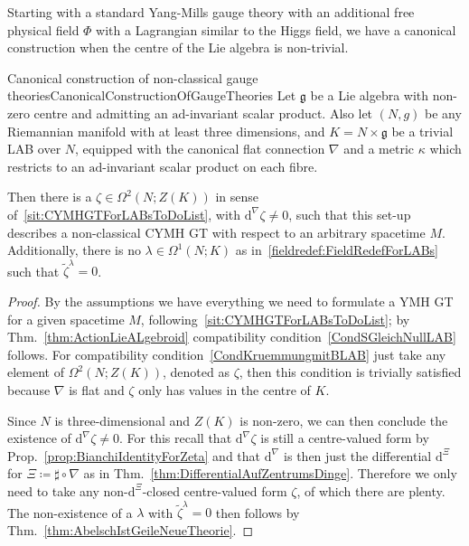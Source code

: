 Starting with a standard Yang-Mills gauge theory with an additional free physical field $\Phi$ with a Lagrangian similar to the Higgs field, we have a canonical construction when the centre of the Lie algebra is non-trivial.

\begin{corollaries}{Canonical construction of non-classical gauge theories}{CanonicalConstructionOfGaugeTheories}
Let $\mathfrak{g}$ be a Lie algebra with non-zero centre and admitting an $\mathrm{ad}$-invariant scalar product. Also let $(N, g)$ be any Riemannian manifold with at least three dimensions, and $K = N \times \mathfrak{g}$ be a trivial LAB over $N$, equipped with the canonical flat connection $\nabla$ and a metric $\kappa$ which restricts to an $\mathrm{ad}$-invariant scalar product on each fibre.

Then there is a $\zeta \in \Omega^2(N; Z(K))$ in sense of~\ref{sit:CYMHGTForLABsToDoList}, with $\mathrm{d}^\nabla \zeta \neq 0$, such that this set-up describes a non-classical CYMH GT with respect to an arbitrary spacetime $M$. Additionally, there is no $\lambda\in\Omega^1(N;K)$ as in~\ref{fieldredef:FieldRedefForLABs} such that $\widetilde{\zeta}^\lambda = 0$.
\end{corollaries}

\begin{proof}
\leavevmode\newline
By the assumptions we have everything we need to formulate a YMH GT for a given spacetime $M$, following~\ref{sit:CYMHGTForLABsToDoList}; by Thm.~\ref{thm:ActionLieALgebroid} compatibility condition~\eqref{CondSGleichNullLAB} follows. For compatibility condition~\eqref{CondKruemmungmitBLAB} just take any element of $\Omega^2(N; Z(K))$, denoted as $\zeta$, then this condition is trivially satisfied because $\nabla$ is flat and $\zeta$ only has values in the centre of $K$.

Since $N$ is three-dimensional and $Z(K)$ is non-zero, we can then conclude the existence of $\mathrm{d}^\nabla \zeta \neq 0$. For this recall that $\mathrm{d}^\nabla \zeta$ is still a centre-valued form by Prop.~\ref{prop:BianchiIdentityForZeta} and that $\mathrm{d}^\nabla$ is then just the differential $\mathrm{d}^\Xi$ for $\Xi \coloneqq \sharp \circ \nabla$ as in Thm.~\ref{thm:DifferentialAufZentrumsDinge}. Therefore we only need to take any non-$\mathrm{d}^\Xi$-closed centre-valued form $\zeta$, of which there are plenty. The non-existence of a $\lambda$ with $\widetilde{\zeta}^\lambda = 0$ then follows by Thm.~\ref{thm:AbelschIstGeileNeueTheorie}.
\end{proof}

